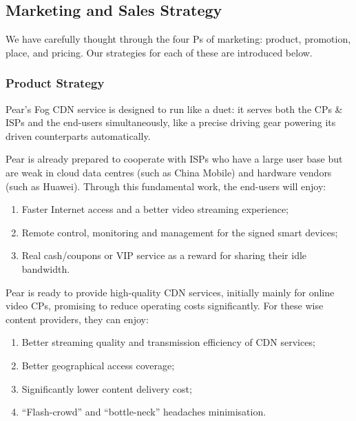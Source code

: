 \subsection{Marketing and Sales Strategy}
We have carefully thought through the four Ps of marketing: product, promotion, place, and pricing. Our strategies for each of these are introduced below. 

\subsubsection{Product Strategy}
Pear's Fog CDN service is designed to run like a duet: it serves both the CPs \& ISPs and the end-users simultaneously, like a precise driving gear powering its driven counterparts automatically.

Pear is already prepared to cooperate with ISPs who have a large user base but are weak in cloud data centres (such as China Mobile) and hardware vendors (such as Huawei). Through this fundamental work, the end-users will enjoy:
\begin{enumerate}
	\item Faster Internet access and a better video streaming experience;
	\item Remote control, monitoring and management for the signed smart devices;
	\item Real cash/coupons or VIP service as a reward for sharing their idle bandwidth.
\end{enumerate}

Pear is ready to provide high-quality CDN services, initially mainly for online video CPs, promising to reduce operating costs significantly. For these wise content providers, they can enjoy: 
\begin{enumerate}
	\item Better streaming quality and transmission efficiency of CDN services;
	\item Better geographical access coverage;
	\item Significantly lower content delivery cost;
	\item ``Flash-crowd'' and ``bottle-neck'' headaches minimisation.    
\end{enumerate}

